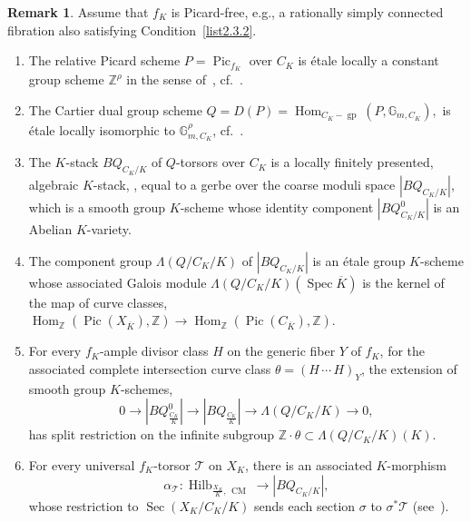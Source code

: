 \documentclass[11pt]{article}
\theoremstyle{definition}
\newtheorem{rema}[theo]{Remark}
\numberwithin{equation}{section}
\numberwithin{figure}{section}
\numberwithin{table}{section}
\newcommand{\mbb}{\mathbb}
\newcommand{\ZZ}{\mbb{Z}}
\newcommand{\mc}{\mathcal}
\newcommand{\mcT}{\mc{T}}
\newcommand{\ol}{\overline}
\newcommand{\Gm}[1]{\mathbb{G}_{#1}}
\newcommand{\Xx}{X}
\newcommand{\Cc}{C}
\newcommand{\FR}{K}
\DeclareMathOperator{\Pic}{Pic}
\DeclareMathOperator{\SP}{Spec}
\DeclareMathOperator{\Hilb}{Hilb}
\DeclareMathOperator{\Sec}{Sec}
\DeclareMathOperator{\cm}{CM}
\DeclareMathOperator{\Hom}{Hom}
\DeclareMathOperator{\gp}{gp}
\newcommand*{\romanenumi}{\renewcommand*{\theenumi}{\roman{enumi}}}
\begin{document}
\begin{rema}\label{rmk-Zhu}
Assume that $f_\FR$ is Picard-free, e.g., a rationally simply connected fibration also satisfying Condition~\eqref{list2.3.2}.
\begin{enumerate}\romanenumi
\item \label{list2.4.1}The relative Picard scheme $P=\Pic_{f_\FR}$ over $\Cc_\FR$ is étale locally a constant group scheme $\ZZ^\rho$ in the sense of~\cite[Definition~X.5.1]{SGA3II}, cf.~\cite[Proposition~2.9]{Zhu}.
\item \label{list2.4.2}The Cartier dual group scheme $Q=D(P)=
\Hom_{\Cc_\FR-\gp}(P,\Gm{m,\Cc_\FR}),$ is étale locally isomorphic to $\Gm{m,\Cc_\FR}^\rho$, cf.~\cite[Proposition~X.5.3]{SGA3II}.
\item \label{list2.4.3}The $\FR$-stack $BQ_{\Cc_\FR/\FR}$ of $Q$-torsors over $\Cc_\FR$ is a locally finitely presented, algebraic $\FR$-stack, \cite[Proposition~2.3.4]{Lieblich}, equal to a gerbe over the coarse moduli space $|BQ_{\Cc_\FR/\FR}|$, which is a smooth group $\FR$-scheme whose identity component $|BQ^0_{\Cc_\FR/\FR}|$ is an Abelian $\FR$-variety.
\item \label{list2.4.4}The component group $\Lambda(Q/\Cc_\FR/\FR)$ of $|BQ_{\Cc_\FR/\FR}|$ is an étale group $\FR$-scheme whose associated Galois module $\Lambda(Q/\Cc_\FR/\FR)(\SP \ol{\FR})$ is the kernel of the map of curve classes, $\Hom_\ZZ(\Pic(\Xx_{\ol{\FR}}),\ZZ) \to
\Hom_\ZZ(\Pic(\Cc_{\ol{\FR}}),\ZZ).$
\item \label{list2.4.5}For every $f_\FR$-ample divisor class $H$ on the generic fiber $Y$ of $f_\FR$, for the associated complete intersection curve class $\theta=(H\,\cdots\,H)_Y$,
the extension of smooth group $\FR$-schemes,
\[
0\to
|BQ^0_{\frac{\Cc_{\FR}}{\FR}}| \to |BQ_{\frac{\Cc_{\FR}}{\FR}}| \to \Lambda(Q/\Cc_\FR/\FR)
\to 0,
\]
has split restriction on the infinite subgroup $\ZZ\cdot \theta \subset \Lambda(Q/\Cc_\FR/\FR)(\FR).$
\item \label{list2.4.6}For every universal $f_\FR$-torsor $\mcT$ on $\Xx_\FR$,
there is an associated $\FR$-morphism
\[
\alpha_\mcT:
\Hilb_{\frac{\Xx_\FR}{\FR},\,\cm} \to |BQ_{\Cc_\FR/\FR}|,
\]
whose
restriction to $\Sec(\Xx_\FR/\Cc_\FR/\FR)$ sends each section $\sigma$ to $\sigma^*\mcT$ (see~\cite[Proposition~3.3]{Zhu}).
\end{enumerate}
\end{rema}
\end{document}
